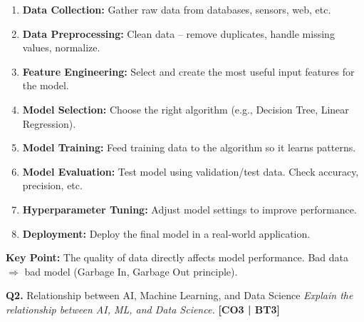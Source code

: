 \documentclass[12pt,a4paper]{article}
\newcommand{\Qno}[1]{\textbf{\color{darkred}Q#1.}}
\newcommand{\term}[1]{\textbf{\color{headingcolor}#1}}
\begin{document}
\begin{answerenv}
\begin{center}
\end{center}

\begin{enumerate}[leftmargin=1.8em, itemsep=3pt]
  \item \term{Data Collection:} Gather raw data from databases, sensors, web, etc.
  \item \term{Data Preprocessing:} Clean data -- remove duplicates, handle missing values, normalize.
  \item \term{Feature Engineering:} Select and create the most useful input features for the model.
  \item \term{Model Selection:} Choose the right algorithm (e.g., Decision Tree, Linear Regression).
  \item \term{Model Training:} Feed training data to the algorithm so it learns patterns.
  \item \term{Model Evaluation:} Test model using validation/test data. Check accuracy, precision, etc.
  \item \term{Hyperparameter Tuning:} Adjust model settings to improve performance.
  \item \term{Deployment:} Deploy the final model in a real-world application.
\end{enumerate}

\begin{keypoint}
\textbf{Key Point:} The quality of data directly affects model performance. Bad data $\Rightarrow$ bad model (Garbage In, Garbage Out principle).
\end{keypoint}

\end{answerenv}

\vspace{8pt}

\begin{questionbox}{\Qno{2} Relationship between AI, Machine Learning, and Data Science}
\textit{Explain the relationship between AI, ML, and Data Science.} \hfill \textbf{[CO3 | BT3]}
\end{questionbox}
\end{document}
